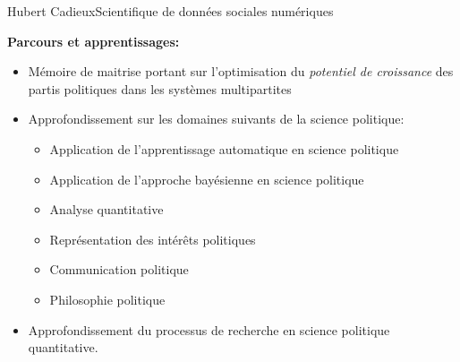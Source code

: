 \documentclass{article}
\begin{document}
\begin{cv}[avatar]{Hubert Cadieux}{Scientifique de données sociales numériques}





\begin{cvevent}[2024][présent]
    \textbf{Parcours et apprentissages:}
    \begin{itemize}
        \item Mémoire de maitrise portant sur l'optimisation du \textit{potentiel de croissance} des partis politiques dans les systèmes multipartites
        \item Approfondissement sur les domaines suivants de la science politique:
        \begin{itemize}
            \item Application de l'apprentissage automatique en science politique
            \item Application de l'approche bayésienne en science politique
            \item Analyse quantitative
            \item Représentation des intérêts politiques
            \item Communication politique
            \item Philosophie politique
        \end{itemize}
        \item Approfondissement du processus de recherche en science politique quantitative.\\[10pt]
    \end{itemize}
\end{cvevent}


\end{cv}
\end{document}
